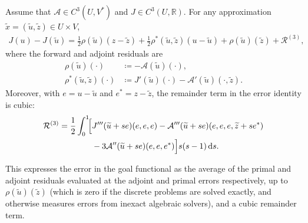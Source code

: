 \begin{theorem}
\label{thm:becker-rannacher}
Assume that \(\mathcal{A}\in C^3(U,V^\ast)\) and \(J\in C^3(U,\mathbb{R})\). For any approximation \(\widetilde{x}=(\widetilde{u},\widetilde{z})\in U\times V\),
\begin{align}
  J(u)-J(\widetilde{u})
  =
  \frac{1}{2}\rho(\widetilde{u})(z-\widetilde{z})
  +
  \frac{1}{2}
  \rho^\ast(\widetilde{u},\widetilde{z})
  (u-\widetilde{u})
  +
  \rho(\widetilde{u})(\widetilde{z})
  +
  \mathcal{R}^{(3)},
  \label{eq:nonlinear-dwr-identity}
\end{align}
where the forward and adjoint residuals are
\begin{align}
  \rho(\widetilde{u})(\cdot)
  &\coloneqq
  -\mathcal{A}(\widetilde{u})(\cdot),
  \label{eq:nonlinear-primal-residual}\\
  \rho^\ast(\widetilde{u},\widetilde{z})(\cdot)
  &\coloneqq
  J'(\widetilde{u})(\cdot)
  -
  \mathcal{A}'(\widetilde{u})
  (\cdot,\widetilde{z}).
  \label{eq:nonlinear-adjoint-residual}
\end{align}
Moreover, with \(e=u-\widetilde u\) and \(e^\ast=z-\widetilde z\), the remainder term in the error identity is cubic:
\begin{equation}
 \begin{aligned}
 \mathcal R^{(3)}
 =\frac12\int_0^1\!\Bigl[{}
 &J'''(\widetilde u+se)(e,e,e) -\mathcal A'''(\widetilde u+se)
   (e,e,e,\widetilde z+se^\ast)\\
 &-3\mathcal A''(\widetilde u+se)(e,e,e^\ast)
 \Bigr]s(s-1)\,\mathrm ds .
 \end{aligned}
 \label{eq:nonlinear-dwr-remainder}
\end{equation}
\end{theorem}

This expresses the error in the goal functional as the average of the primal and adjoint residuals evaluated at the adjoint and primal errors respectively, up to $\rho(\widetilde{u})(\widetilde{z})$ (which is zero if the discrete problems are solved exactly, and otherwise measures errors from inexact algebraic solvers), and a cubic remainder term.

